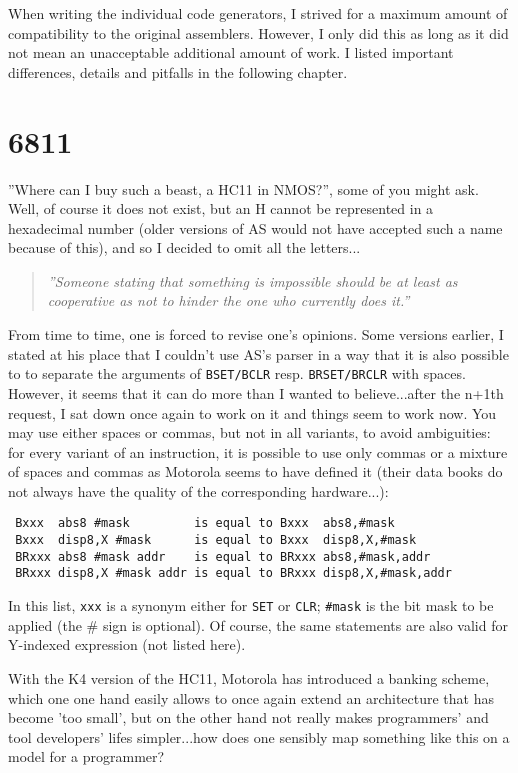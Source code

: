 \documentclass[12pt,twoside]{report}
\newcommand{\tty}[1]{{\tt #1}}
\begin{document}
When writing the individual code generators, I strived for a maximum
amount of compatibility to the original assemblers.  However, I only did this
as long as it did not mean an unacceptable additional amount of work.
I listed important differences, details and pitfalls in the following
chapter.


\section{6811}

''Where can I buy such a beast, a HC11 in NMOS?'', some of you might
ask.  Well, of course it does not exist, but an H cannot be
represented in a hexadecimal number (older versions of AS would not
have accepted such a name because of this), and so I decided to omit
all the letters...
\par
\begin{quote}{\it
''Someone stating that something is impossible should be at least as
 cooperative as not to hinder the one who currently does it.''
}\end{quote}
From time to time, one is forced to revise one's opinions.  Some versions
earlier, I stated at his place that I couldn't use AS's parser in a way
that it is also possible to to separate the arguments of \tty{BSET/BCLR}
resp. \tty{BRSET/BRCLR} with spaces.  However, it seems that it can do
more than I wanted to believe...after the n+1th request, I sat down once
again to work on it and things seem to work now.  You may use either
spaces or commas, but not in all variants, to avoid ambiguities: for
every variant of an instruction, it is possible to use only commas or a
mixture of spaces and commas as Motorola seems to have defined it (their
data books do not always have the quality of the corresponding
hardware...):
\begin{verbatim}
 Bxxx  abs8 #mask         is equal to Bxxx  abs8,#mask
 Bxxx  disp8,X #mask      is equal to Bxxx  disp8,X,#mask
 BRxxx abs8 #mask addr    is equal to BRxxx abs8,#mask,addr
 BRxxx disp8,X #mask addr is equal to BRxxx disp8,X,#mask,addr
\end{verbatim}
In this list, \tty{xxx} is a synonym either for \tty{SET} or \tty{CLR};
\tty{\#mask} is the bit mask to be applied (the \# sign is optional).  Of
course, the same statements are also valid for Y-indexed expression (not
listed here).

With the K4 version  of the HC11, Motorola has introduced a banking
scheme, which one one hand easily allows to once again extend an
architecture that has become 'too small', but on the other hand not really
makes programmers' and tool developers' lifes simpler...how does one
sensibly map something like this on a model for a programmer?
\end{document}
